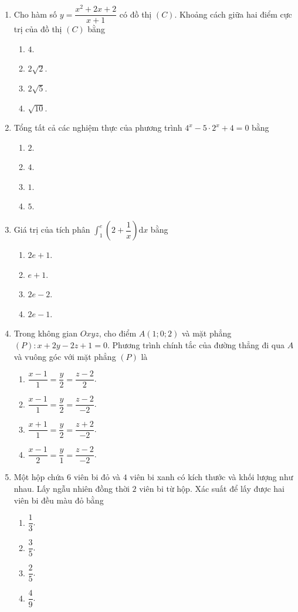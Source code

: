\documentclass[12pt,a4paper]{article}
\begin{document}
\begin{enumerate}[label=\textbf{Câu \arabic*:}, leftmargin=*]

\item Cho hàm số $y = \dfrac{x^2 + 2x + 2}{x + 1}$ có đồ thị $(C)$. Khoảng cách giữa hai điểm cực trị của đồ thị $(C)$ bằng
\begin{enumerate}[label=\Alph*.]
    \item $4$.
    \item $2\sqrt{2}$.
    \item $2\sqrt{5}$.
    \item $\sqrt{10}$.
\end{enumerate}

\item Tổng tất cả các nghiệm thực của phương trình $4^x - 5\cdot 2^x + 4 = 0$ bằng
\begin{enumerate}[label=\Alph*.]
    \item $2$.
    \item $4$.
    \item $1$.
    \item $5$.
\end{enumerate}

\item Giá trị của tích phân $\displaystyle \int_1^e \left(2 + \dfrac{1}{x}\right)\mathrm{d}x$ bằng
\begin{enumerate}[label=\Alph*.]
    \item $2e + 1$.
    \item $e + 1$.
    \item $2e - 2$.
    \item $2e - 1$.
\end{enumerate}

\item Trong không gian $Oxyz$, cho điểm $A(1; 0; 2)$ và mặt phẳng $(P): x + 2y - 2z + 1 = 0$. Phương trình chính tắc của đường thẳng đi qua $A$ và vuông góc với mặt phẳng $(P)$ là
\begin{enumerate}[label=\Alph*.]
    \item $\dfrac{x - 1}{1} = \dfrac{y}{2} = \dfrac{z - 2}{2}$.
    \item $\dfrac{x - 1}{1} = \dfrac{y}{2} = \dfrac{z - 2}{-2}$.
    \item $\dfrac{x + 1}{1} = \dfrac{y}{2} = \dfrac{z + 2}{-2}$.
    \item $\dfrac{x - 1}{2} = \dfrac{y}{1} = \dfrac{z - 2}{-2}$.
\end{enumerate}

\item Một hộp chứa $6$ viên bi đỏ và $4$ viên bi xanh có kích thước và khối lượng như nhau. Lấy ngẫu nhiên đồng thời $2$ viên bi từ hộp. Xác suất để lấy được hai viên bi đều màu đỏ bằng
\begin{enumerate}[label=\Alph*.]
    \item $\dfrac{1}{3}$.
    \item $\dfrac{3}{5}$.
    \item $\dfrac{2}{5}$.
    \item $\dfrac{4}{9}$.
\end{enumerate}


\end{enumerate}
\end{document}
